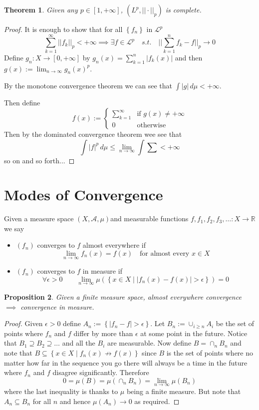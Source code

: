 \documentclass[11pt]{article}
\newcommand{\defeq}{:=}
\newcommand{\abs}[1]{|#1|}
\newcommand{\norm}[1]{||#1||}
\newcommand{\msrspc}{\ensuremath{(X,\mathcal{A},\mu)}}
\newcommand{\relmiddle}[1]{\mathrel{}\middle#1\mathrel{}}
\newcommand{\rmv}{\relmiddle|}
\newcommand{\dm}{\ensuremath{\,d\mu}}
\newcommand{\R}{\mathbb{R}}
\newenvironment{defin}
	{\begin{mdframed}[backgroundcolor=white, roundcorner=5pt, linewidth=1pt]}
	{\end{mdframed}}
\newcommand{\mdf}[1]{{\color{red} #1}}
\newtheorem{theorem}{Theorem}[section]
\newtheorem{prop}[theorem]{Proposition}
\begin{document}
\begin{theorem}
Given any $p\in[1, +\infty]$, $(L^p, \norm{\cdot}_p)$ is complete.
\end{theorem}

\begin{proof}
It is enough to show that for all $\left\{f_n\right\}$ in $\mathcal{L}^p$
\[
	\sum_{k=1}^{\infty}\norm{f_k}_p < +\infty \implies \exists f\in\mathcal{L}^p \quad s.t. \quad \norm{\sum_{k=1}^{n}f_k-f}_p \to 0
\]
Define $g_n:X\to [0, +\infty]$ by $g_n(x)=\sum_{k=1}^{n}\abs{f_k(x)}$ and then $g(x)\defeq \lim_{n\to\infty}g_n(x)^p$.

By the monotone convergence theorem we can see that $\int\abs{g}\dm < + \infty$.

Then define
\[
	f(x)\defeq
	\begin{cases}
		\sum_{k=1}^{\infty} & \text{if } g(x)\neq + \infty \\
		0 & \text{otherwise}
	\end{cases}
\]
Then by the dominated convergence theorem wee see that
\[
	\int\abs{f}^p \dm \leq \lim_{n\to\infty}\int\sum < +\infty
\]
so on and so forth...
\end{proof}

\section{Modes of Convergence}
\begin{defin}
Given a measure space \msrspc	 and measurable functions $f,f_1, f_2, f_3, \dots:X\to \R$ we say
\begin{itemize}
	\item $(f_n)$ \mdf{converges to $f$ almost everywhere} if
		\[
			\lim_{n\to\infty}f_n (x) = f(x) \quad \text{for almost every }x\in X
		\]
	\item $(f_n)$ \mdf{converges to $f$ in measure} if
		\[
			\forall\epsilon >0 \quad \quad\lim_{n\to\infty}\mu\left(\left\{x\in X \rmv \abs{f_n(x)-f(x)}>\epsilon\right\}\right)=0
		\]
		
\end{itemize}
\end{defin}
\begin{prop}
Given a finite measure space, almost everywhere convergence $\implies$ convergence in measure.
\end{prop}

\begin{proof}
Given $\epsilon >0$ define $A_n\defeq\left\{\abs{f_n -f} > \epsilon \right\}$.
Let $B_n\defeq \cup_{i \geq n} A_i$ be the set of points where $f_n$ and $f$ differ by more than $\epsilon$ at some point in the future.
Notice that $B_1 \supseteq B_2 \supseteq \dots$ and all the $B_i$ are measurable.
Now define $B=\cap_n B_n$ and note that $B \subseteq \left\{x\in X \rmv f_n(x) \not\to f(x)\right\}$ since $B$ is the set of points where no matter how far in the sequence you go there will always be a time in the future where $f_n$ and $f$ disagree significantly.
Therefore
\[
	0 = \mu(B) = \mu(\cap_n B_n) = \lim_{n\to\infty}\mu(B_n)
\]
where the last inequality is thanks to $\mu$ being a finite measure.
But note that $A_n \subseteq B_n$ for all $n$ and hence $\mu(A_n)\to 0$ as required.
\end{proof}
\end{document}
